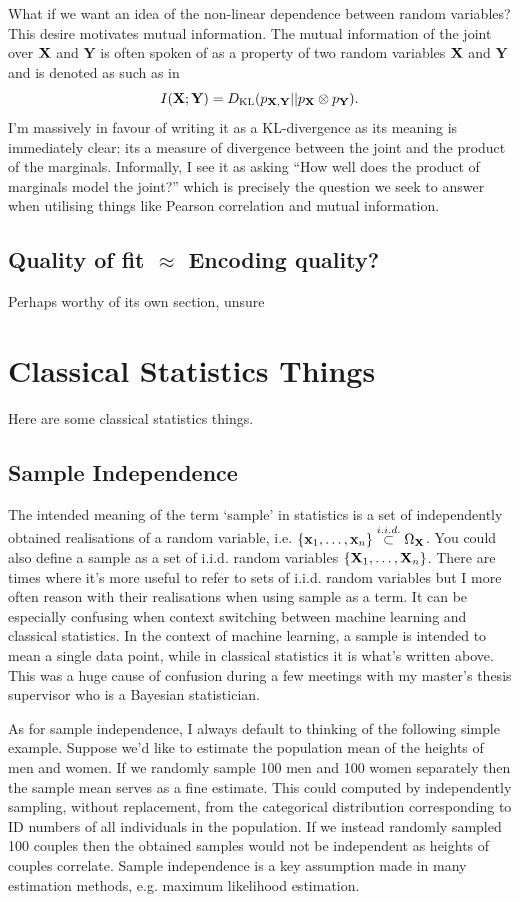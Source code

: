 \documentclass[11pt]{article}
\begin{document}
\begin{appendices}
What if we want an idea of the non-linear dependence between random variables? This desire motivates mutual information. The mutual information of the joint over $\mathbf{X}$ and $\mathbf{Y}$ is often spoken of as a property of two random variables $\mathbf{X}$ and $\mathbf{Y}$ and is denoted as such as in
$$
I(\mathbf{X};\mathbf{Y})
=
D_{\text{KL}}(p_{\mathbf{X},\mathbf{Y}}||p_{\mathbf{X}}\otimes p_{\mathbf{Y}}).
$$
I'm massively in favour of writing it as a KL-divergence as its meaning is immediately clear: its a measure of divergence between the joint and the product of the marginals. Informally, I see it as asking ``How well does the product of marginals model the joint?'' which is precisely the question we seek to answer when utilising things like Pearson correlation and mutual information.

\subsection{Quality of fit $\approx$ Encoding quality?}
\TODO Perhaps worthy of its own section, unsure

\section{Classical Statistics Things}
Here are some classical statistics things.

\subsection{Sample Independence}
The intended meaning of the term `sample' in statistics is a set of independently obtained realisations of a random variable, i.e. $\{\mathbf{x}_1,\dots,\mathbf{x}_n\}\overset{i.i.d.}{\subset}\Omega_{\mathbf{X}}$. You could also define a sample as a set of i.i.d. random variables $\{\mathbf{X}_1,\dots,\mathbf{X}_n\}$. There are times where it's more useful to refer to sets of i.i.d. random variables but I more often reason with their realisations when using sample as a term. It can be especially confusing when context switching between machine learning and classical statistics. In the context of machine learning, a sample is intended to mean a single data point, while in classical statistics it is what's written above. This was a huge cause of confusion during a few meetings with my master's thesis supervisor who is a Bayesian statistician.

As for sample independence, I always default to thinking of the following simple example. Suppose we'd like to estimate the population mean of the heights of men and women. If we randomly sample 100 men and 100 women separately then the sample mean serves as a fine estimate. This could computed by independently sampling, without replacement, from the categorical distribution corresponding to ID numbers of all individuals in the population. If we instead randomly sampled 100 couples then the obtained samples would not be independent as heights of couples correlate. Sample independence is a key assumption made in many estimation methods, e.g. maximum likelihood estimation.


\end{appendices}
\end{document}
